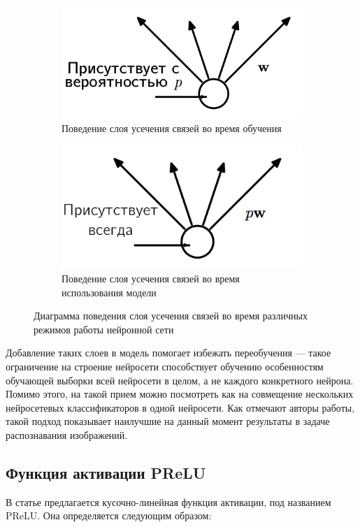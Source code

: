 \documentclass[14pt, a4paper]{extarticle}
\begin{document}
\begin{figure}[!h]
\begin{subfigure}{.5\textwidth}
	\centering
	\includegraphics[scale=.85]{images/dropout1.png}
	\caption{Поведение слоя усечения связей во время обучения}
\end{subfigure}
\begin{subfigure}{.5\textwidth}
	\centering
	\includegraphics[scale=.9]{images/dropout2.png}
	\caption{Поведение слоя усечения связей во время использования модели}
\end{subfigure}
\caption{Диаграмма поведения слоя усечения связей во время различных режимов работы нейронной сети}
\label{figure:dropout}
\end{figure}

Добавление таких слоев в модель помогает избежать переобучения — такое ограничение на строение нейросети способствует обучению особенностям обучающей выборки всей нейросети в целом, а не каждого конкретного нейрона. Помимо этого, на такой прием можно посмотреть как на совмещение нескольких нейросетевых классификаторов в одной нейросети. Как отмечают авторы работы, такой подход показывает наилучшие на данный момент результаты в задаче распознавания изображений.

\subsection*{Функция активации PReLU}
В статье \cite{prelu} предлагается кусочно-линейная функция активации, под названием PReLU. Она определяется следующим образом:
\end{document}
